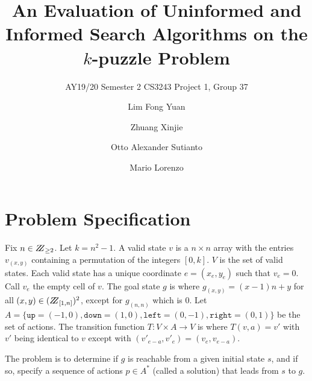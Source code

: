 \documentclass[runningheads]{llncs}
\begin{document}
%
\title{An Evaluation of Uninformed and Informed Search Algorithms on the $k$-puzzle Problem}
\subtitle{AY19/20 Semester 2 CS3243 Project 1, Group 37}
%
%
\author{Lim Fong Yuan \and
Zhuang Xinjie \and
Otto Alexander Sutianto \and
Mario Lorenzo}
%
%
%
\maketitle              %
%

%
%
%
\section{Problem Specification}
Fix $n \in \bbbz_{\geq 2}$. Let $k = n^2 -1$.
A valid state $v$ is a $n \times n$ array with the entries $v_{(x,y)}$ containing a permutation of the integers $[0,k]$. $V$ is the set of valid states.
Each valid state has a unique coordinate $e = (x_e,y_e)$ such that $v_e = 0$. Call $v_e$ the empty cell of $v$.
The goal state $g$ is where $g_{(x,y)} = (x-1)n+y$ for all $(x,y) \in (\bbbz_{[1,n]})^2$, except for $g_{(n,n)}$ which is $0$.
Let $A = \{\texttt{up}=(-1,0),\texttt{down}=(1,0),\texttt{left}=(0,-1),\texttt{right}=(0,1)\}$ be the set of actions.
The transition function $T: V \times A \to V$ is where $T(v,a) = v'$ with $v'$ being identical to $v$ except with $(v'_{e-a},v'_e) = (v_e,v_{e-a})$.%

The problem is to determine if $g$ is reachable from a given initial state $s$, and if so, specify a sequence of actions $p \in A^\ast$ (called a solution) that leads from $s$ to $g$.
\end{document}
